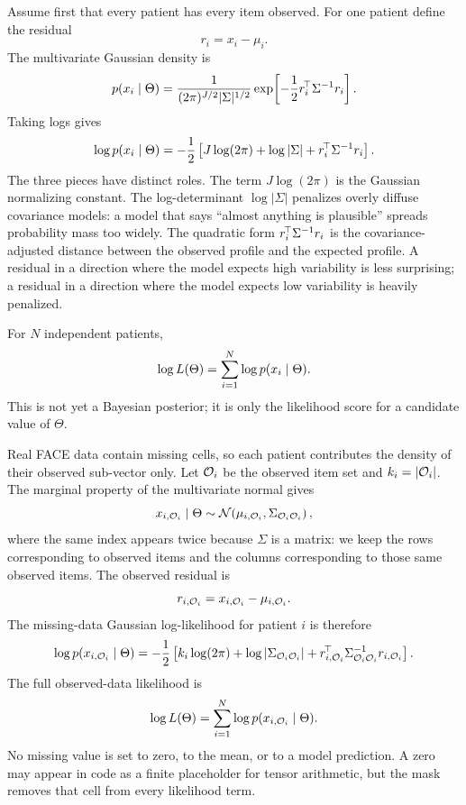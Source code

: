 Assume first that every patient has every item observed. For one patient define the residual
\begin{equation}
r_i=x_i-\mu_i.
\end{equation}
The multivariate Gaussian density is
\begin{equation}
p(x_i\mid\Theta)
=\frac{1}{(2\pi)^{J/2}|\Sigma|^{1/2}}
\exp\!\left[-\frac{1}{2}r_i^{\!\top}\Sigma^{-1}r_i\right].
\end{equation}
Taking logs gives
\begin{equation}
\label{eq:dense_loglik}
\log p(x_i\mid\Theta)
=-\frac{1}{2}\left[J\log(2\pi)+\log|\Sigma|+r_i^{\!\top}\Sigma^{-1}r_i\right].
\end{equation}
The three pieces have distinct roles. The term $J\log(2\pi)$ is the Gaussian normalizing constant. The
log-determinant $\log|\Sigma|$ penalizes overly diffuse covariance models: a model that says ``almost anything
is plausible'' spreads probability mass too widely. The quadratic form $r_i^{\!\top}\Sigma^{-1}r_i$ is the
covariance-adjusted distance between the observed profile and the expected profile. A residual in a direction
where the model expects high variability is less surprising; a residual in a direction where the model expects
low variability is heavily penalized.

For $N$ independent patients,
\begin{equation}
\label{eq:full_dense_loglik}
\log L(\Theta)=\sum_{i=1}^{N}\log p(x_i\mid\Theta).
\end{equation}
This is not yet a Bayesian posterior; it is only the likelihood score for a candidate value of $\Theta$.

Real FACE data contain missing cells, so each patient contributes the density of their observed sub-vector only.
Let $\mathcal{O}_i$ be the observed item set and $k_i=|\mathcal{O}_i|$. The marginal property of the multivariate normal gives
\begin{equation}
x_{i,\mathcal{O}_i}\mid\Theta
\sim
\mathcal{N}\!\left(\mu_{i,\mathcal{O}_i},\Sigma_{\mathcal{O}_i\mathcal{O}_i}\right),
\end{equation}
where the same index appears twice because $\Sigma$ is a matrix: we keep the rows corresponding to observed items
and the columns corresponding to those same observed items. The observed residual is
\begin{equation}
r_{i,\mathcal{O}_i}=x_{i,\mathcal{O}_i}-\mu_{i,\mathcal{O}_i}.
\end{equation}
The missing-data Gaussian log-likelihood for patient $i$ is therefore
\begin{equation}
\label{eq:missing_loglik}
\log p(x_{i,\mathcal{O}_i}\mid\Theta)
=-\frac{1}{2}\left[
k_i\log(2\pi)
+\log|\Sigma_{\mathcal{O}_i\mathcal{O}_i}|
+r_{i,\mathcal{O}_i}^{\!\top}\Sigma_{\mathcal{O}_i\mathcal{O}_i}^{-1}r_{i,\mathcal{O}_i}
\right].
\end{equation}
The full observed-data likelihood is
\begin{equation}
\label{eq:observed_loglik}
\log L(\Theta)
=\sum_{i=1}^{N}\log p(x_{i,\mathcal{O}_i}\mid\Theta).
\end{equation}
No missing value is set to zero, to the mean, or to a model prediction. A zero may appear in code as a finite
placeholder for tensor arithmetic, but the mask removes that cell from every likelihood term.

